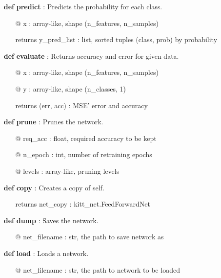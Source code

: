{\begin{minipage}{\textwidth}
\begin{tcolorbox}[boxsep=0pt,top=10pt,left=10pt,right=10pt, bottom=10pt, arc=0pt, auto outer arc, colback=white, colframe=lightgray]
\begin{itemize}
\begin{itemize}
\end{itemize}
\item[\textbf{def}] \textbf{predict} : Predicts the probability for each class.
\begin{itemize}
\item[@] x    	\hspace{50pt}	: array-like, shape (n\_features, n\_samples)  
\item[returns] y\_pred\_list \hspace{7pt}	: list, sorted tuples (class, prob) by probability
\end{itemize}
\item[\textbf{def}] \textbf{evaluate} : Returns accuracy and error for given data.
\begin{itemize}
\item[@] x    	\hspace{22pt}	: array-like, shape (n\_features, n\_samples)
\item[@] y    	\hspace{22pt}	: array-like, shape (n\_classes, 1)  
\item[returns] (err, acc) \hspace{23pt}	: MSE' error and accuracy
\end{itemize}
\item[\textbf{def}] \textbf{prune} : Prunes the network.
\begin{itemize}
\item[@] req\_acc    	\hspace{22pt}	: float, required accuracy to be kept
\item[@] n\_epoch    	\hspace{19pt}	: int, number of retraining epochs
\item[@] levels    	\hspace{35pt}	: array-like, pruning levels
\end{itemize}
\item[\textbf{def}] \textbf{copy} : Creates a copy of self.
\begin{itemize} 
\item[returns] net\_copy \hspace{15pt}	: kitt\_net.FeedForwardNet
\end{itemize}
\item[\textbf{def}] \textbf{dump} : Saves the network.
\begin{itemize} 
\item[@] net\_filename \hspace{15pt}	: str, the path to save network as
\end{itemize}
\item[\textbf{def}] \textbf{load} : Loads a network.
\begin{itemize} 
\item[@] net\_filename \hspace{15pt}	: str, the path to network to be loaded
\end{itemize}
\end{itemize}
\normalsize
\end{tcolorbox}
\end{minipage}}